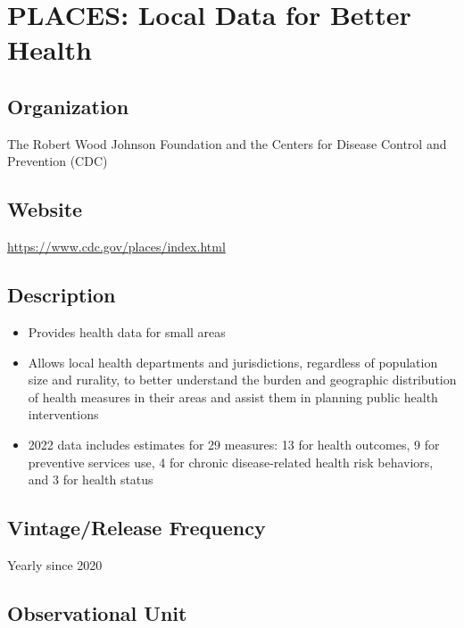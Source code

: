 \documentclass[
]{book}
\providecommand{\tightlist}{%
  \setlength{\itemsep}{0pt}\setlength{\parskip}{0pt}}
\begin{document}
\mainmatter

\hypertarget{places-local-data-for-better-health}{%
\chapter{PLACES: Local Data for Better Health}\label{places-local-data-for-better-health}}

\hypertarget{organization-72}{%
\section{Organization}\label{organization-72}}

The Robert Wood Johnson Foundation and the Centers for Disease Control and Prevention (CDC)

\hypertarget{website-72}{%
\section{Website}\label{website-72}}

\url{https://www.cdc.gov/places/index.html}

\hypertarget{description-72}{%
\section{Description}\label{description-72}}

\begin{itemize}
\tightlist
\item
  Provides health data for small areas
\item
  Allows local health departments and jurisdictions, regardless of population size and rurality, to better understand the burden and geographic distribution of health measures in their areas and assist them in planning public health interventions
\item
  2022 data includes estimates for 29 measures: 13 for health outcomes, 9 for preventive services use, 4 for chronic disease-related health risk behaviors, and 3 for health status
\end{itemize}

\hypertarget{vintagerelease-frequency-72}{%
\section{Vintage/Release Frequency}\label{vintagerelease-frequency-72}}

Yearly since 2020

\hypertarget{observational-unit-72}{%
\section{Observational Unit}\label{observational-unit-72}}
\end{document}
